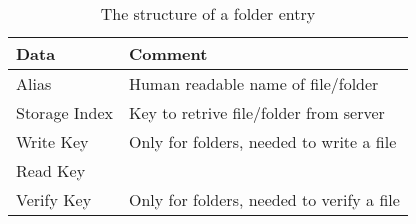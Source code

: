 \begin{table}
  \centering
  \caption{The structure of a folder entry}
  \begin{tabular}{ | l | l |}
    \hline
    \textbf{Data}       & \textbf{Comment}                          \\ \hline
     Alias              & Human readable name of file/folder        \\ \hline
     Storage Index      & Key to retrive file/folder from server    \\ \hline
     Write Key          & Only for folders, needed to write a file  \\ \hline
     Read Key           &                                           \\ \hline
     Verify Key         & Only for folders, needed to verify a file  \\ \hline
  \end{tabular}
  \label{tbl:folder:contents}
\end{table}
